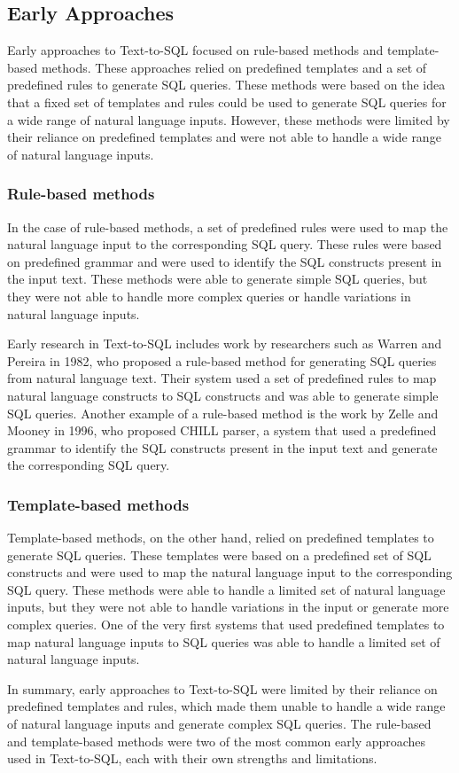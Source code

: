 \subsection{Early Approaches}
Early approaches to Text-to-SQL focused on rule-based methods and template-based methods. These approaches relied on predefined templates and a set of predefined rules to generate SQL queries. These methods were based on the idea that a fixed set of templates and rules could be used to generate SQL queries for a wide range of natural language inputs. However, these methods were limited by their reliance on predefined templates and were not able to handle a wide range of natural language inputs.

\subsubsection{Rule-based methods}
In the case of rule-based methods, a set of predefined rules were used to map the natural language input to the corresponding SQL query. These rules were based on predefined grammar and were used to identify the SQL constructs present in the input text. These methods were able to generate simple SQL queries, but they were not able to handle more complex queries or handle variations in natural language inputs.

Early research in Text-to-SQL includes work by researchers such as Warren and Pereira in 1982\cite{Warren1982AnEE}, who proposed a rule-based method for generating SQL queries from natural language text. Their system used a set of predefined rules to map natural language constructs to SQL constructs and was able to generate simple SQL queries. Another example of a rule-based method is the work by Zelle and Mooney in 1996, who proposed CHILL parser\cite{Zelle1996LearningTP}, a system that used a predefined grammar to identify the SQL constructs present in the input text and generate the corresponding SQL query.

\subsubsection{Template-based methods}
Template-based methods, on the other hand, relied on predefined templates to generate SQL queries. These templates were based on a predefined set of SQL constructs and were used to map the natural language input to the corresponding SQL query. These methods were able to handle a limited set of natural language inputs, but they were not able to handle variations in the input or generate more complex queries. One of the very first systems that used predefined templates to map natural language inputs to SQL queries was able to handle a limited set of natural language inputs.

In summary, early approaches to Text-to-SQL were limited by their reliance on predefined templates and rules, which made them unable to handle a wide range of natural language inputs and generate complex SQL queries. The rule-based and template-based methods were two of the most common early approaches used in Text-to-SQL, each with their own strengths and limitations.
